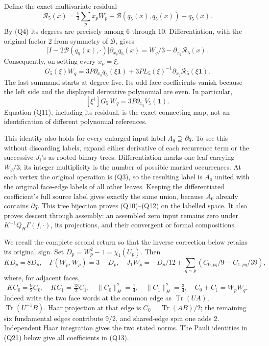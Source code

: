 \documentclass[11pt]{article}
\begin{document}
Define the exact multivariate residual
\[
 \mathcal R_5(x)=\tfrac13\sum_p x_pW_p+\mathcal B(q_5(x),q_5(x))-q_5(x).
 \tag{Q9}
\]
By (Q4) its degrees are precisely among 6 through 10. Differentiation, with the original factor 2 from symmetry of \(\mathcal B\), gives
\[
 \bigl[I-2\mathcal B(q_5(x),\cdot)\bigr]\partial_{x_q}q_5(x)
 =W_q/3-\partial_{x_q}\mathcal R_5(x).
 \tag{Q10}
\]
Consequently, on setting every \(x_p=\xi\),
\[
 G_5(\xi)W_q
 =3P\partial_{x_q}q_5(\xi\mathbf1)
  +3PL_5(\xi)^{-1}\partial_{x_q}\mathcal R_5(\xi\mathbf1).
 \tag{Q11}
\]
The last summand starts at degree five. Its odd face coefficients vanish because the left side and the displayed derivative polynomial are even. In particular,
\[
 [\xi^4]G_5\,W_q=3P\partial_{x_q}V_5(\mathbf1).
 \tag{Q12}
\]
Equation (Q11), including its residual, is the exact connecting map, not an identification of different polynomial references.

This identity also holds for every enlarged input label \(A_0\supseteq\partial q\). To see this without discarding labels, expand either derivative of each recurrence term or the successive \(J_i\)'s as rooted binary trees. Differentiation marks one leaf carrying \(W_q/3\); its integer multiplicity is the number of possible marked occurrences. At each vertex the original operation is (Q3), so the resulting label is \(A_0\) united with the original face-edge labels of all other leaves. Keeping the differentiated coefficient's full source label gives exactly the same union, because \(A_0\) already contains \(\partial q\). This tree bijection proves (Q10)–(Q12) on the labelled space. It also proves descent through assembly: an assembled zero input remains zero under \(K^{-1}Q_H\Gamma(f,\cdot)\), its projections, and their convergent or formal compositions.

We recall the complete second return so that the inverse correction below retains its original sign. Set \(D_p=W_p^2-1=\chi_1(U_p)\). Then
\[
 KD_p=8D_p,\quad \Gamma(W_p,W_p)=3-D_p,\quad
 J_1W_p=-D_p/12+\sum_{q\sim p}(C_{0,pq}/9-C_{1,pq}/39),
 \tag{Q13}
\]
where, for adjacent faces,
\[
 KC_0=\tfrac92C_0,\quad KC_1=\tfrac{13}2C_1,\quad
 \|C_0\|_H^2=\tfrac14,\quad\|C_1\|_H^2=\tfrac34,\quad
 C_0+C_1=W_pW_q.
 \tag{Q14}
\]
Indeed write the two face words at the common edge as \(\operatorname{Tr}(UA)\), \(\operatorname{Tr}(U^{-1}B)\). Haar projection at that edge is \(C_0=\operatorname{Tr}(AB)/2\); the remaining six fundamental edges contribute \(9/2\), and shared-edge spin one adds 2. Independent Haar integration gives the two stated norms. The Pauli identities in (Q21) below give all coefficients in (Q13).
\end{document}
